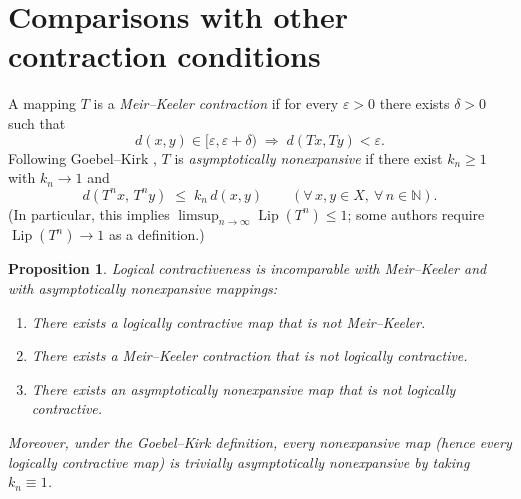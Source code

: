 \documentclass[11pt]{article}
\newtheorem{proposition}[theorem]{Proposition}
\theoremstyle{definition}
\theoremstyle{remark}
\DeclareMathOperator{\Lip}{Lip}
\begin{document}
\section{Comparisons with other contraction conditions}
A mapping $T$ is a \emph{Meir--Keeler contraction} \cite{2} if for every $\varepsilon>0$ there exists $\delta>0$ such that
\[
d(x,y)\in [\varepsilon,\varepsilon+\delta) \;\Rightarrow\; d(Tx,Ty) < \varepsilon.
\]
Following Goebel--Kirk \cite{3}, $T$ is \emph{asymptotically nonexpansive} if there exist $k_n\ge 1$ with $k_n\to 1$ and
\[
d(T^n x,\,T^n y)\;\le\; k_n\, d(x,y)\qquad(\forall\,x,y\in X,\ \forall\,n\in\mathbb{N}).
\]
(In particular, this implies $\limsup_{n\to\infty}\Lip(T^n)\le 1$; some authors require $\Lip(T^n)\to 1$ as a definition.)

\begin{proposition}\label{prop:incomparability}
Logical contractiveness is incomparable with Meir--Keeler and with asymptotically nonexpansive mappings:
\begin{enumerate}
\item There exists a logically contractive map that is not Meir--Keeler.
\item There exists a Meir--Keeler contraction that is not logically contractive.
\item There exists an asymptotically nonexpansive map that is not logically contractive.
\end{enumerate}
Moreover, under the Goebel--Kirk definition, every nonexpansive map (hence every logically contractive map) is trivially asymptotically nonexpansive by taking $k_n\equiv 1$.
\end{proposition}
\end{document}
